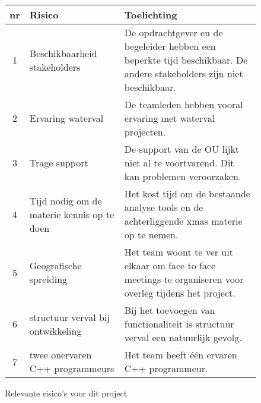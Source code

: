 \begin{figure}[ht]
\begin{center}
\tiny
\begin{tabular}{|c|p{20em}|p{30em}|}
\hline
{\bf nr} & {\bf Risico} & {\bf Toelichting} \\\hline
 1 & Beschikbaarheid stakeholders  & De opdrachtgever en de begeleider hebben een beperkte tijd
					beschikbaar. De andere stakeholders zijn niet beschikbaar.\\\hline
 2 & Ervaring waterval & De teamleden hebben vooral ervaring met waterval projecten.\\\hline
 3 & Trage support & De support van de OU lijkt niet al te voortvarend. Dit kan problemen veroorzaken.\\\hline
 4 & Tijd nodig om de materie kennis op te doen & Het kost tijd om de bestaande analyse
					tools en de achterliggende
					xmas materie op te nemen.\\\hline
 5 & Geografische spreiding & Het team woont te ver uit elkaar om face to face meetings te
				organiseren voor overleg tijdens het project.\\\hline
 6 & structuur verval bij ontwikkeling & Bij het toevoegen van functionaliteit is structuur verval een
				natuurlijk gevolg.\\\hline
 7 & twee onervaren C++ programmeurs & Het team heeft \'e\'en ervaren C++ programmeur.\\\hline

\end{tabular}
\end{center}
 \caption{Relevante risico's voor dit project}
 \label{fig: risico}
\end{figure}


